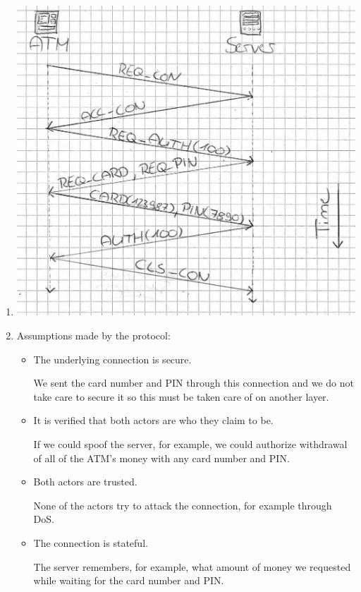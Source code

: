 \documentclass[12pt, a4paper]{article}
\begin{document}
\begin{enumerate}[a]
	\item %
	\includegraphics[width=\linewidth]{images/4b}

	\item %
	Assumptions made by the protocol:
	\begin{itemize}
		\item The underlying connection is secure.

		We sent the card number and PIN through this connection and we do not take care to secure it so this must be taken care of on another layer.
		\item It is verified that both actors are who they claim to be.

		If we could spoof the server, for example, we could authorize withdrawal of all of the ATM's money with any card number and PIN.
		\item Both actors are trusted.

		None of the actors try to attack the connection, for example through DoS.
		\item The connection is stateful.

		The server remembers, for example, what amount of money we requested while waiting for the card number and PIN.
	\end{itemize}
\end{enumerate}
\end{document}
